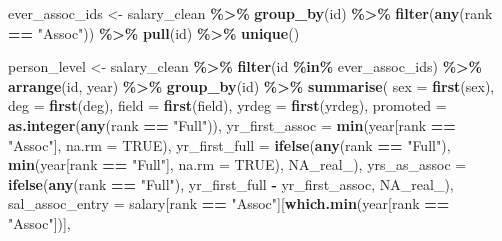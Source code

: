 \documentclass[
]{article}
\newenvironment{Shaded}{\begin{snugshade}}{\end{snugshade}}
\newcommand{\AttributeTok}[1]{\textcolor[rgb]{0.13,0.29,0.53}{#1}}
\newcommand{\ConstantTok}[1]{\textcolor[rgb]{0.56,0.35,0.01}{#1}}
\newcommand{\FunctionTok}[1]{\textcolor[rgb]{0.13,0.29,0.53}{\textbf{#1}}}
\newcommand{\NormalTok}[1]{#1}
\newcommand{\OtherTok}[1]{\textcolor[rgb]{0.56,0.35,0.01}{#1}}
\newcommand{\SpecialCharTok}[1]{\textcolor[rgb]{0.81,0.36,0.00}{\textbf{#1}}}
\newcommand{\StringTok}[1]{\textcolor[rgb]{0.31,0.60,0.02}{#1}}
\begin{document}
\begin{Shaded}
\begin{Highlighting}[]
\NormalTok{ever\_assoc\_ids }\OtherTok{\textless{}{-}}\NormalTok{ salary\_clean }\SpecialCharTok{\%\textgreater{}\%}
  \FunctionTok{group\_by}\NormalTok{(id) }\SpecialCharTok{\%\textgreater{}\%}
  \FunctionTok{filter}\NormalTok{(}\FunctionTok{any}\NormalTok{(rank }\SpecialCharTok{==} \StringTok{"Assoc"}\NormalTok{)) }\SpecialCharTok{\%\textgreater{}\%}
  \FunctionTok{pull}\NormalTok{(id) }\SpecialCharTok{\%\textgreater{}\%}
  \FunctionTok{unique}\NormalTok{()}

\NormalTok{person\_level }\OtherTok{\textless{}{-}}\NormalTok{ salary\_clean }\SpecialCharTok{\%\textgreater{}\%}
  \FunctionTok{filter}\NormalTok{(id }\SpecialCharTok{\%in\%}\NormalTok{ ever\_assoc\_ids) }\SpecialCharTok{\%\textgreater{}\%}
  \FunctionTok{arrange}\NormalTok{(id, year) }\SpecialCharTok{\%\textgreater{}\%}
  \FunctionTok{group\_by}\NormalTok{(id) }\SpecialCharTok{\%\textgreater{}\%}
  \FunctionTok{summarise}\NormalTok{(}
    \AttributeTok{sex             =} \FunctionTok{first}\NormalTok{(sex),}
    \AttributeTok{deg             =} \FunctionTok{first}\NormalTok{(deg),}
    \AttributeTok{field           =} \FunctionTok{first}\NormalTok{(field),}
    \AttributeTok{yrdeg           =} \FunctionTok{first}\NormalTok{(yrdeg),}
    \AttributeTok{promoted        =} \FunctionTok{as.integer}\NormalTok{(}\FunctionTok{any}\NormalTok{(rank }\SpecialCharTok{==} \StringTok{"Full"}\NormalTok{)),}
    \AttributeTok{yr\_first\_assoc  =} \FunctionTok{min}\NormalTok{(year[rank }\SpecialCharTok{==} \StringTok{"Assoc"}\NormalTok{], }\AttributeTok{na.rm =} \ConstantTok{TRUE}\NormalTok{),}
    \AttributeTok{yr\_first\_full   =} \FunctionTok{ifelse}\NormalTok{(}\FunctionTok{any}\NormalTok{(rank }\SpecialCharTok{==} \StringTok{"Full"}\NormalTok{),}
                             \FunctionTok{min}\NormalTok{(year[rank }\SpecialCharTok{==} \StringTok{"Full"}\NormalTok{], }\AttributeTok{na.rm =} \ConstantTok{TRUE}\NormalTok{), }\ConstantTok{NA\_real\_}\NormalTok{),}
    \AttributeTok{yrs\_as\_assoc    =} \FunctionTok{ifelse}\NormalTok{(}\FunctionTok{any}\NormalTok{(rank }\SpecialCharTok{==} \StringTok{"Full"}\NormalTok{),}
\NormalTok{                             yr\_first\_full }\SpecialCharTok{{-}}\NormalTok{ yr\_first\_assoc, }\ConstantTok{NA\_real\_}\NormalTok{),}
    \AttributeTok{sal\_assoc\_entry =}\NormalTok{ salary[rank }\SpecialCharTok{==} \StringTok{"Assoc"}\NormalTok{][}\FunctionTok{which.min}\NormalTok{(year[rank }\SpecialCharTok{==} \StringTok{"Assoc"}\NormalTok{])],}

\end{Highlighting}
\end{Shaded}
\end{document}

